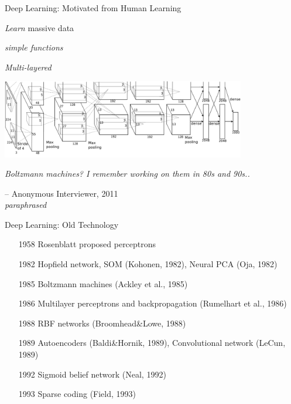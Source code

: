 \documentclass{beamer}
\begin{document}
\begin{frame}{Deep Learning: Motivated from Human Learning}
     \begin{minipage}{0.32\textwidth}
         \centering
         \small
         \textit{Learn} massive data
     \end{minipage}
     \hfill
     \begin{minipage}{0.32\textwidth}
         \centering
         \small
         \textit{simple functions}
     \end{minipage}
     \hfill
     \begin{minipage}{0.32\textwidth}
         \centering
         \small
         \textit{Multi-layered} 
     \end{minipage}

     \vspace{3mm}
    \centering
    \includegraphics[width=0.8\textwidth]{alex_imagenet}
    \\

    \vfill

\end{frame}

\begin{frame}
\centering
\emph{Boltzmann machines? I remember working on them in 80s and 90s..}

\vspace{2.5mm}
\begin{flushright}
-- Anonymous Interviewer, 2011 \\ {\small \emph{paraphrased}}
    \end{flushright}
\end{frame}

\begin{frame}{Deep Learning: Old Technology}

\begin{enumerate}
\item[1958] Rosenblatt proposed perceptrons 
\item[1982] Hopfield network, SOM {\scriptsize (Kohonen, 1982)}, Neural PCA {\scriptsize (Oja, 1982)}
\item[1985] Boltzmann machines {\scriptsize (Ackley et al., 1985)}
\item[1986] Multilayer perceptrons and backpropagation {\scriptsize (Rumelhart et al., 1986)}
\item[1988] RBF networks {\scriptsize (Broomhead\&Lowe, 1988)}
\item[1989] Autoencoders {\scriptsize (Baldi\&Hornik, 1989)}, Convolutional network {\scriptsize (LeCun, 1989)}
\item[1992] Sigmoid belief network {\scriptsize (Neal, 1992)}
\item[1993] Sparse coding {\scriptsize (Field, 1993)}
\end{enumerate}

\end{frame}
\end{document}

